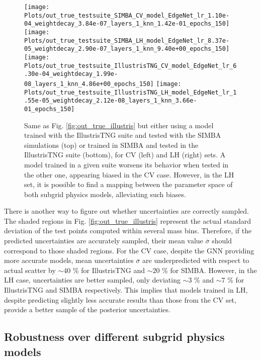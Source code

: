 \documentclass[twocolumn]{aastex631}
\begin{document}
\begin{figure*}[th!]
\begin{center}
\texttt{[image: Plots/out\_true\_testsuite\_SIMBA\_CV\_model\_EdgeNet\_lr\_1.10e-04\_weightdecay\_3.84e-07\_layers\_1\_knn\_1.42e-01\_epochs\_150]}
\texttt{[image: Plots/out\_true\_testsuite\_SIMBA\_LH\_model\_EdgeNet\_lr\_8.37e-05\_weightdecay\_2.90e-07\_layers\_1\_knn\_9.40e+00\_epochs\_150]}
\texttt{[image: Plots/out\_true\_testsuite\_IllustrisTNG\_CV\_model\_EdgeNet\_lr\_6.30e-04\_weightdecay\_1.99e-08\_layers\_1\_knn\_4.86e+00\_epochs\_150]}
\texttt{[image: Plots/out\_true\_testsuite\_IllustrisTNG\_LH\_model\_EdgeNet\_lr\_1.55e-05\_weightdecay\_2.12e-08\_layers\_1\_knn\_3.66e-01\_epochs\_150]}
\caption{Same as Fig. \ref{fig:out_true_illustris} but either using a model trained with the IllustrisTNG suite and tested with the SIMBA simulations (top) or trained in SIMBA and tested in the IllustrisTNG suite (bottom), for CV (left) and LH (right) sets. A model trained in a given suite worsens its behavior when tested in the other one, appearing biased in the CV case. However, in the LH set, it is possible to find a mapping between the parameter space of both subgrid physics models, alleviating such biases.}
\label{fig:out_true_simba}
\end{center}
\end{figure*}

There is another way to figure out whether uncertainties are correctly sampled. The shaded regions in Fig. \ref{fig:out_true_illustris} represent the actual standard deviation of the test points computed within several mass bins. Therefore, if the predicted uncertainties are accurately sampled, their mean value $\overline{\sigma}$ should correspond to those shaded regions. For the CV case, despite the GNN providing more accurate models, mean uncertainties $\overline{\sigma}$ are underpredicted with respect to actual scatter by $\sim 40$ \% for IllustrisTNG and $\sim 20$ \%  for SIMBA. However, in the LH case, uncertainties are better sampled, only deviating $\sim 3$ \% and $\sim 7$ \% for IllustrisTNG and SIMBA respectively. This implies that models trained in LH, despite predicting slightly less accurate results than those from the CV set, provide a better sample of the posterior uncertainties.








\subsection{Robustness over different subgrid physics models}
\label{sec:robust}
\end{document}
